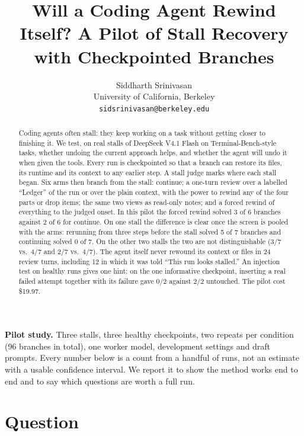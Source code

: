 \documentclass{article}
\title{Will a Coding Agent Rewind Itself? A Pilot of Stall Recovery with Checkpointed Branches}
\author{%
  Siddharth Srinivasan\\
  University of California, Berkeley\\
  \texttt{sidsrinivasan@berkeley.edu}
}
\begin{document}
\maketitle

\noindent\colorbox{pilotbg}{\parbox{\dimexpr\linewidth-2\fboxsep}{\small
\textbf{Pilot study.} Three stalls, three healthy checkpoints, two repeats per condition (96 branches in total), one
worker model, development settings and draft prompts. Every number below is a count from a handful of runs, not an
estimate with a usable confidence interval. We report it to show the method works end to end and to say which
questions are worth a full run.}}

\begin{abstract}
Coding agents often stall: they keep working on a task without getting closer to finishing it. We test, on real
stalls of DeepSeek V4.1 Flash on Terminal-Bench-style tasks, whether undoing the current approach helps, and whether the
agent will undo it when given the tools. Every run is checkpointed so that a branch can restore its files, its
runtime and its context to any earlier step. A stall judge marks where each stall began. Six arms then branch from the
stall: continue; a one-turn review over a labelled ``Ledger'' of the run or over the plain context, with the power to
rewind any of the four parts or drop items; the same two views as read-only notes; and a forced rewind of everything
to the judged onset. In this pilot the forced rewind solved 3 of 6 branches against 2 of 6 for continue. On one stall
the difference is clear once the screen is pooled with the arms: rerunning from three steps before the stall solved 5
of 7 branches and continuing solved 0 of 7. On the other two stalls the two are not distinguishable (3/7 vs.\ 4/7 and
2/7 vs.\ 4/7). The agent itself never rewound its context or files in 24 review turns, including 12 in which it was told
``This run looks stalled.'' An injection test on healthy runs gives one hint: on the one informative checkpoint,
inserting a real failed attempt together with its failure gave 0/2 against 2/2 untouched. The pilot cost \$19.97.
\end{abstract}

\section{Question}
\label{sec:question}
\end{document}
